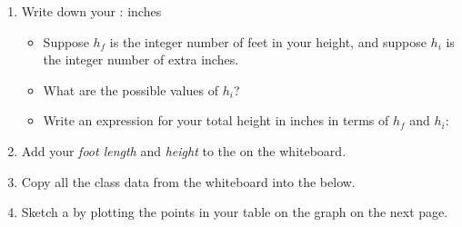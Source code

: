 \documentclass[12pt,letterpaper]{memoir}
\begin{document}
\begin{enumerate}[fullwidth,label={\Large$\bm{\square}$}\,\arabic*.,resume]
        \item Write down your : \underline{\hspace{1in}} inches
        \begin{itemize}
            \item Suppose $h_f$ is the integer number of feet in your height,
                and suppose $h_i$ is the integer number of extra inches.
            \item What are the possible values of $h_i$? \hrulefill
            \item Write an expression for your total height 
                in inches in terms of $h_f$ and $h_i$: \hrulefill
        \end{itemize}
    \item Add your {\itshape foot length} and {\itshape height} to the  on the whiteboard.
    \item Copy all the class data from the whiteboard into the  below.
    \item Sketch a  by plotting the points in your table on the graph on the next page.
\end{enumerate}
\end{document}
